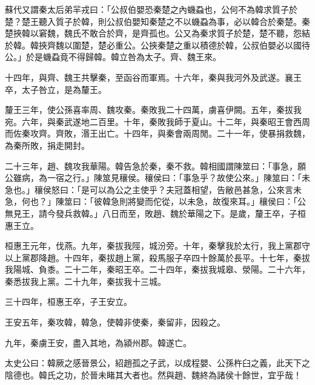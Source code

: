 \begin{pinyinscope}
蘇代又謂秦太后弟羋戎曰：「公叔伯嬰恐秦楚之內蟣蝨也，公何不為韓求質子於楚？楚王聽入質子於韓，則公叔伯嬰知秦楚之不以蟣蝨為事，必以韓合於秦楚。秦楚挾韓以窘魏，魏氏不敢合於齊，是齊孤也。公又為秦求質子於楚，楚不聽，怨結於韓。韓挾齊魏以圍楚，楚必重公。公挾秦楚之重以積德於韓，公叔伯嬰必以國待公。」於是蟣蝨竟不得歸韓。韓立咎為太子。齊、魏王來。

十四年，與齊、魏王共擊秦，至函谷而軍焉。十六年，秦與我河外及武遂。襄王卒，太子咎立，是為釐王。

釐王三年，使公孫喜率周、魏攻秦。秦敗我二十四萬，虜喜伊闕。五年，秦拔我宛。六年，與秦武遂地二百里。十年，秦敗我師于夏山。十二年，與秦昭王會西周而佐秦攻齊。齊敗，湣王出亡。十四年，與秦會兩周閒。二十一年，使暴捐救魏，為秦所敗，捐走開封。

二十三年，趙、魏攻我華陽。韓告急於秦，秦不救。韓相國謂陳筮曰：「事急，願公雖病，為一宿之行。」陳筮見穰侯。穰侯曰：「事急乎？故使公來。」陳筮曰：「未急也。」穰侯怒曰：「是可以為公之主使乎？夫冠蓋相望，告敝邑甚急，公來言未急，何也？」陳筮曰：「彼韓急則將變而佗從，以未急，故復來耳。」穰侯曰：「公無見王，請今發兵救韓。」八日而至，敗趙、魏於華陽之下。是歲，釐王卒，子桓惠王立。

桓惠王元年，伐燕。九年，秦拔我陘，城汾旁。十年，秦擊我於太行，我上黨郡守以上黨郡降趙。十四年，秦拔趙上黨，殺馬服子卒四十餘萬於長平。十七年，秦拔我陽城、負黍。二十二年，秦昭王卒。二十四年，秦拔我城皋、滎陽。二十六年，秦悉拔我上黨。二十九年，秦拔我十三城。

三十四年，桓惠王卒，子王安立。

王安五年，秦攻韓，韓急，使韓非使秦，秦留非，因殺之。

九年，秦虜王安，盡入其地，為潁州郡。韓遂亡。

太史公曰：韓厥之感晉景公，紹趙孤之子武，以成程嬰、公孫杵臼之義，此天下之陰德也。韓氏之功，於晉未睹其大者也。然與趙、魏終為諸侯十餘世，宜乎哉！


\end{pinyinscope}